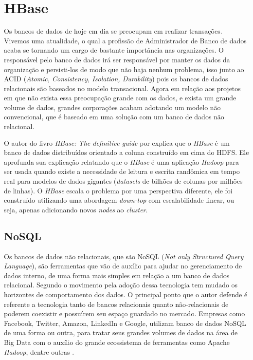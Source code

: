     \section{HBase}

        Os bancos de dados de hoje em dia se preocupam em realizar transações. Vivemos uma atualidade, o qual a profissão de
        Administrador de Banco de dados acaba se tornando um cargo de bastante importância nas organizações. O responsável
        pelo banco de dados irá ser responsável por manter os dados da organização e persisti-los de modo que não haja nenhum
        problema, isso junto ao ACID (\textit{Atomic, Consistency, Isolation, Durability}) pois os bancos de dados relacionais são
        baseados no modelo transacional. Agora em relação aos projetos em que não exista essa preocupação grande com os
        dados, e exista um grande volume de dados, grandes corporações acabam adotando um modelo não convencional,
        que é baseado em uma solução com um banco de dados não relacional.

        O autor do livro \textit{HBase: The definitive guide} por  explica que o \textit{HBase} é um
        banco de dados distribuídos orientado a coluna construído em cima do HDFS. Ele aprofunda sua explicação relatando
        que o \textit{HBase} é uma aplicação \textit{Hadoop} para ser usada quando existe a necessidade de leitura e escrita
        randômica em tempo real para modelos de dados gigantes (\textit{datasets} de bilhões de colunas por milhões de linhas).
        O \textit{HBase} escala o problema por uma perspectiva diferente, ele foi construído utilizando uma abordagem
        \textit{down-top} com escalabilidade linear, ou seja, apenas adicionando novos \textit{nodes} ao \textit{cluster}.

        \subsection{NoSQL}

            Os bancos de dados não relacionais, que são NoSQL (\textit{Not only Structured Query Language}), são ferramentas
            que vão de auxílio para ajudar no gerenciamento de dados interno, de uma forma mais simples em relação a um
            banco de dados relacional. Segundo  o movimento pela adoção dessa tecnologia
            tem mudado os horizontes de comportamento dos dados. O principal ponto que o autor defende é referente a
            tecnologia tanto de bancos relacionais quanto não-relacionais de poderem coexistir e possuírem seu espaço
            guardado no mercado. Empresas como Facebook, Twitter, Amazon, LinkedIn e Google, utilizam banco de dados
            NoSQL de uma forma ou outra, para tratar seus grandes volumes de dados na área de Big Data com o auxílio do
            grande ecossistema de ferramentas como Apache \textit{Hadoop}, dentre outras \cite{moniruzzaman2013}.

